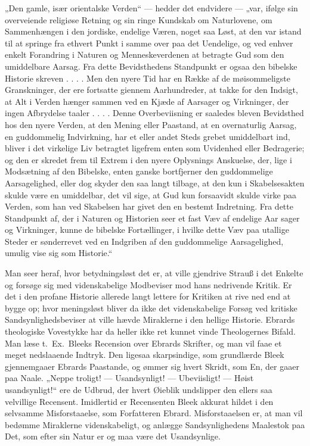 \documentclass[12pt,a4paper]{book}
\newcommand{\opage}[1]{\marginnote{\footnotesize\textit{[#1]}}}
\begin{document}
„Den gamle, især orientalske Verden“ --- hedder det endvidere --- „var,
ifølge sin overveiende religiøse Retning og sin ringe Kundskab om
Naturlovene, om Sammenhængen i den jordiske, endelige Væren, noget saa
Løst, at den var istand til at springe fra ethvert Punkt i samme over paa
det Uendelige, og ved enhver enkelt Forandring i Naturen og
Menneskeverdenen at betragte Gud som den umiddelbare Aarsag. Fra dette
Bevidsthedens Standpunkt er ogsaa den bibelske Historie skreven . . . .
Men den nyere Tid har en Række af de møisommeligste Granskninger, der ere
fortsatte giennem Aarhundreder, at takke for den Indsigt, at Alt i Verden
hænger sammen ved en Kjæde af Aarsager og Virkninger, der ingen
Afbrydelse taaler . . . . Denne Overbeviisning er saaledes bleven
Bevidsthed hos den nyere Verden, at den Mening eller Paastand, at en
overnaturlig Aarsag, en guddommelig Indvirkning, har et eller andet Steds
grebet umiddelbart ind, bliver i det virkelige Liv betragtet ligefrem
enten som Uvidenhed eller Bedragerie; og den er skredet frem til Extrem i
den nyere Oplysnings Anskuelse, der, lige i Modsætning af den Bibelske,
enten ganske bortfjerner den guddommelige Aarsagelighed, eller dog skyder
den saa langt tilbage, at den kun i Skabelsesakten skulde være en
umiddelbar, det vil sige, at Gud kun forsaavidt skulde virke paa Verden,
som han ved Skabelsen har givet den en bestemt Indretning. Fra dette
Standpunkt af, der i Naturen og Historien seer et fast Væv af endelige
Aar%
\opage{85}sager og Virkninger, kunne de bibelske Fortællinger, i hvilke dette Væv
paa utallige Steder er sønderrevet ved en Indgriben af den guddommelige
Aarsagelighed, umulig vise sig som Historie.“

Man seer heraf, hvor betydningsløst det er, at ville gjendrive Strauß i
det Enkelte og forsøge sig med videnskabelige Modbeviser mod hans
nedrivende Kritik. Er det i den profane Historie allerede langt lettere
for Kritiken at rive ned end at bygge op; hvor meningsløst bliver da ikke
det videnskabelige Forsøg ved kritiske Sandsynlighedsbeviser at ville
hævde Miraklerne i den hellige Historie. Ebrards theologiske Vovestykke
har da heller ikke ret kunnet vinde Theologernes Bifald. Man læse t.\ Ex.\
Bleeks Recension over Ebrards Skrifter, og man vil faae et meget
nedslaaende Indtryk. Den ligesaa skarpsindige, som grundlærde Bleek
gjennemgaaer Ebrards Paastande, og ømmer sig hvert Skridt, som En, der
gaaer paa Naale. „Neppe troligt! --- Usandsynligt! --- Ubeviisligt! ---
Høist usandsynligt!“ ere de Udbrud, der hvert Øieblik undslipper den
ellers saa velvillige Recensent. Imidlertid er Recensenten Bleek akkurat
hildet i den selvsamme Misforstaaelse, som Forfatteren Ebrard.
Misforstaaelsen er, at man vil bedømme Miraklerne videnskabeligt, og
anlægge Sandsynlighedens Maalestok paa Det, som efter sin Natur er og maa
være det Usandsynlige.
\end{document}
